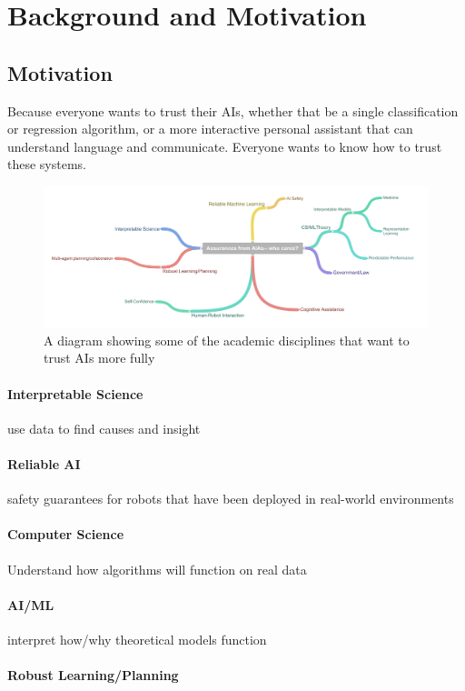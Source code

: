 \section{Background and Motivation} \label{sec:background}

\subsection{Motivation}
    Because everyone wants to trust their AIs, whether that be a single classification or regression algorithm, or a more interactive personal assistant that can understand language and communicate. Everyone wants to know how to trust these systems.  

	\begin{figure}
        \includegraphics[width=7.5in]{Figures/WhoCares_cleaned}%
    	\caption{A diagram showing some of the academic disciplines that want to trust AIs more fully}
        \label{fig:WhoCares}
    \end{figure}

    \paragraph{Interpretable Science} use data to find causes and insight
    \paragraph{Reliable AI} safety guarantees for robots that have been deployed in real-world environments
    \paragraph{Computer Science} Understand how algorithms will function on real data
    \paragraph{AI/ML} interpret how/why theoretical models function
    \paragraph{Robust Learning/Planning}
